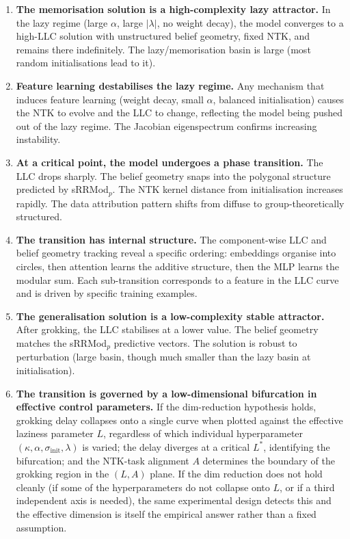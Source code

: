\documentclass[11pt,a4paper]{article}
\begin{document}
\begin{enumerate}[label=\textbf{\arabic*.}]
    \item \textbf{The memorisation solution is a high-complexity lazy attractor.} In the lazy regime (large $\alpha$, large $|\lambda|$, no weight decay), the model converges to a high-LLC solution with unstructured belief geometry, fixed NTK, and remains there indefinitely. The lazy/memorisation basin is large (most random initialisations lead to it).

    \item \textbf{Feature learning destabilises the lazy regime.} Any mechanism that induces feature learning (weight decay, small $\alpha$, balanced initialisation) causes the NTK to evolve and the LLC to change, reflecting the model being pushed out of the lazy regime. The Jacobian eigenspectrum confirms increasing instability.

    \item \textbf{At a critical point, the model undergoes a phase transition.} The LLC drops sharply. The belief geometry snaps into the polygonal structure predicted by sRRMod$_p$. The NTK kernel distance from initialisation increases rapidly. The data attribution pattern shifts from diffuse to group-theoretically structured.

    \item \textbf{The transition has internal structure.} The component-wise LLC and belief geometry tracking reveal a specific ordering: embeddings organise into circles, then attention learns the additive structure, then the MLP learns the modular sum. Each sub-transition corresponds to a feature in the LLC curve and is driven by specific training examples.

    \item \textbf{The generalisation solution is a low-complexity stable attractor.} After grokking, the LLC stabilises at a lower value. The belief geometry matches the sRRMod$_p$ predictive vectors. The solution is robust to perturbation (large basin, though much smaller than the lazy basin at initialisation).

    \item \textbf{The transition is governed by a low-dimensional bifurcation in effective control parameters.} If the dim-reduction hypothesis holds, grokking delay collapses onto a single curve when plotted against the effective laziness parameter $L$, regardless of which individual hyperparameter $(\kappa, \alpha, \sigma_{\mathrm{init}}, \lambda)$ is varied; the delay diverges at a critical $L^*$, identifying the bifurcation; and the NTK-task alignment $A$ determines the boundary of the grokking region in the $(L, A)$ plane. If the dim reduction does not hold cleanly (if some of the hyperparameters do not collapse onto $L$, or if a third independent axis is needed), the same experimental design detects this and the effective dimension is itself the empirical answer rather than a fixed assumption.


\end{enumerate}
\end{document}
